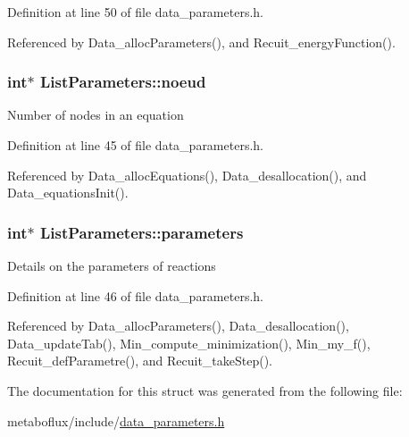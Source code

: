 Definition at line 50 of file data\_\-parameters.h.



Referenced by Data\_\-allocParameters(), and Recuit\_\-energyFunction().

\hypertarget{structListParameters_a1c994d58b286eb0b71a966c1bf079c65}{
\subsubsection[{noeud}]{\setlength{\rightskip}{0pt plus 5cm}int$\ast$ {\bf ListParameters::noeud}}}
\label{structListParameters_a1c994d58b286eb0b71a966c1bf079c65}
Number of nodes in an equation 

Definition at line 45 of file data\_\-parameters.h.



Referenced by Data\_\-allocEquations(), Data\_\-desallocation(), and Data\_\-equationsInit().

\hypertarget{structListParameters_a20e9f07e2dc0f0024591b185bd126cb0}{
\subsubsection[{parameters}]{\setlength{\rightskip}{0pt plus 5cm}int$\ast$ {\bf ListParameters::parameters}}}
\label{structListParameters_a20e9f07e2dc0f0024591b185bd126cb0}
Details on the parameters of reactions 

Definition at line 46 of file data\_\-parameters.h.



Referenced by Data\_\-allocParameters(), Data\_\-desallocation(), Data\_\-updateTab(), Min\_\-compute\_\-minimization(), Min\_\-my\_\-f(), Recuit\_\-defParametre(), and Recuit\_\-takeStep().



The documentation for this struct was generated from the following file:\begin{DoxyCompactItemize}
\item 
metaboflux/include/\hyperlink{data__parameters_8h}{data\_\-parameters.h}\end{DoxyCompactItemize}
